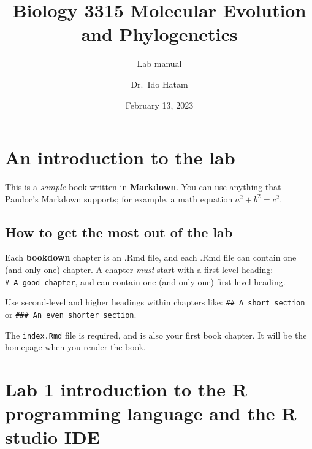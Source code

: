 \documentclass[
]{book}
\title{Biology 3315 Molecular Evolution and Phylogenetics}
\subtitle{Lab manual}
\author{Dr.~Ido Hatam}
\date{February 13, 2023}
\theoremstyle{definition}
\theoremstyle{definition}
\theoremstyle{definition}
\theoremstyle{definition}
\theoremstyle{remark}
\begin{document}
\maketitle

{
\setcounter{tocdepth}{1}
\tableofcontents
}
\hypertarget{an-introduction-to-the-lab}{%
\chapter*{\texorpdfstring{\textbf{An introduction to the lab}}{An introduction to the lab}}\label{an-introduction-to-the-lab}}

This is a \emph{sample} book written in \textbf{Markdown}. You can use anything that Pandoc's Markdown supports; for example, a math equation \(a^2 + b^2 = c^2\).

\hypertarget{how-to-get-the-most-out-of-the-lab}{%
\section*{\texorpdfstring{\textbf{How to get the most out of the lab}}{How to get the most out of the lab}}\label{how-to-get-the-most-out-of-the-lab}}

Each \textbf{bookdown} chapter is an .Rmd file, and each .Rmd file can contain one (and only one) chapter. A chapter \emph{must} start with a first-level heading: \texttt{\#\ A\ good\ chapter}, and can contain one (and only one) first-level heading.

Use second-level and higher headings within chapters like: \texttt{\#\#\ A\ short\ section} or \texttt{\#\#\#\ An\ even\ shorter\ section}.

The \texttt{index.Rmd} file is required, and is also your first book chapter. It will be the homepage when you render the book.

\hypertarget{lab-1-introduction-to-the-r-programming-language-and-the-r-studio-ide}{%
\chapter*{\texorpdfstring{\textbf{Lab 1 introduction to the R programming language and the R studio IDE}}{Lab 1 introduction to the R programming language and the R studio IDE}}\label{lab-1-introduction-to-the-r-programming-language-and-the-r-studio-ide}}
\end{document}
